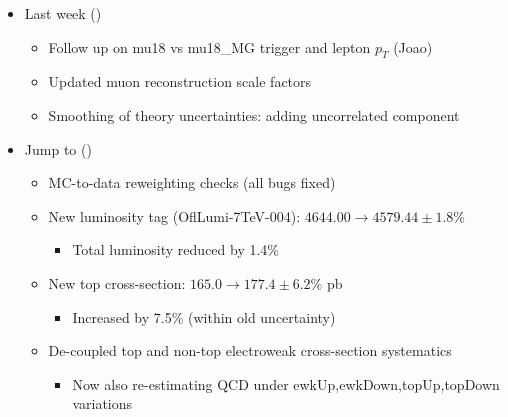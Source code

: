 

{
\begin{itemize}
\item Last week ()
\begin{itemize}
 \item Follow up on mu18 vs mu18\_MG trigger and lepton $p_T$ (Joao)
 \item Updated muon reconstruction scale factors
 \item Smoothing of theory uncertainties: adding uncorrelated component
\end{itemize}
\item Jump to \hyperlink{jul18}{} ()
\begin{itemize}
\item MC-to-data reweighting checks (all bugs fixed)
\item New luminosity tag (OflLumi-7TeV-004): $4644.00 \rightarrow 4579.44 \pm 1.8\%$
\begin{itemize}
\item Total luminosity reduced by 1.4\%
\end{itemize}
\item New top cross-section: $165.0 \rightarrow 177.4 \pm 6.2\%$ pb
\begin{itemize}
\item Increased by 7.5\% (within old uncertainty)
\end{itemize}
\item De-coupled top and non-top electroweak cross-section systematics
\begin{itemize}
\item Now also re-estimating QCD under ewkUp,ewkDown,topUp,topDown variations
\end{itemize}
\end{itemize}
\end{itemize}
}




